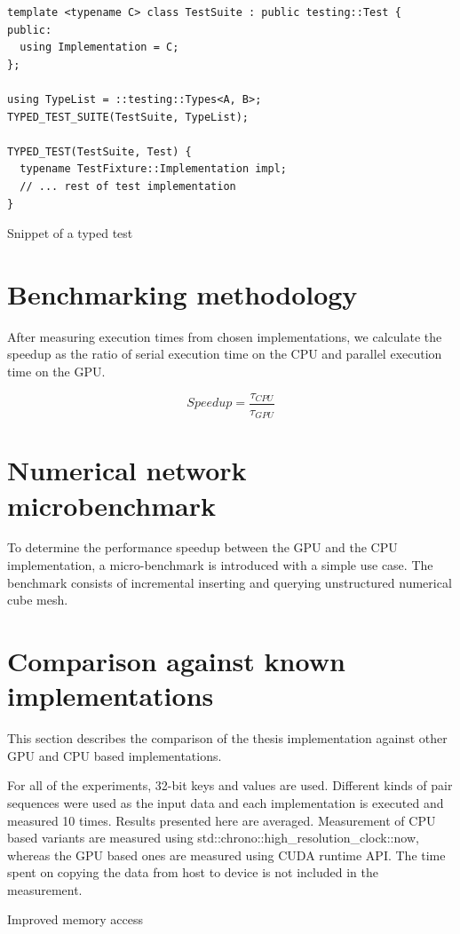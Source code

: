 \begin{listing}
  \begin{verbatim}
template <typename C> class TestSuite : public testing::Test {
public:
  using Implementation = C;
};

using TypeList = ::testing::Types<A, B>;
TYPED_TEST_SUITE(TestSuite, TypeList);

TYPED_TEST(TestSuite, Test) {
  typename TestFixture::Implementation impl;
  // ... rest of test implementation
}
    \end{verbatim}
  \caption{Snippet of a  typed test}\label{lst:gtest-typed}
\end{listing}

\section{Benchmarking methodology}

After measuring execution times from chosen implementations, we calculate the speedup as the ratio of serial execution time on the CPU and parallel execution time on the GPU.

$$\mathit{Speedup} = \frac{\tau_{\mathit{CPU}}}{\tau_{\mathit{GPU}}}$$

\section{Numerical network microbenchmark}



To determine the performance speedup between the GPU and the CPU implementation, a micro-benchmark is introduced with a simple use case. The benchmark consists of incremental inserting and querying unstructured numerical cube mesh.

\section{Comparison against known implementations}

This section describes the comparison of the thesis implementation against other GPU and CPU based implementations. 

For all of the experiments, 32-bit keys and values are used. Different kinds of pair sequences were used as the input data and each implementation is executed and measured 10 times. Results presented here are averaged. Measurement of CPU based variants are measured using {std::chrono::high\_resolution\_clock::now}, whereas the GPU based ones are measured using CUDA runtime API. The time spent on copying the data from host to device is not included in the measurement.



 Improved memory access